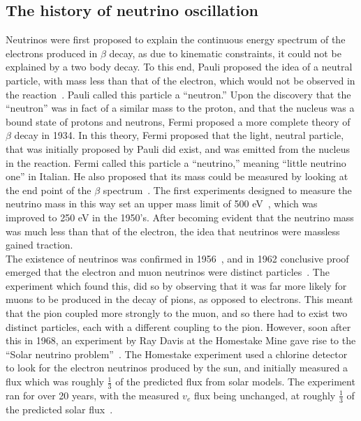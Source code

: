 \subsection{The history of neutrino oscillation} \label{Neut_Hist}
Neutrinos were first proposed to explain the continuous energy spectrum of the electrons produced in $\beta$ decay, as due to kinematic constraints, it could not be explained by a two body decay. To this end, Pauli proposed the idea of a neutral particle, with mass less than that of the electron, which would not be observed in the reaction~\citep{Pauli}. Pauli called this particle a ``neutron.'' Upon the discovery that the ``neutron'' was in fact of a similar mass to the proton, and that the nucleus was a bound state of protons and neutrons, Fermi proposed a more complete theory of $\beta$ decay in 1934. In this theory, Fermi proposed that the light, neutral particle, that was initially proposed by Pauli did exist, and was emitted from the nucleus in the reaction. Fermi called this particle a ``neutrino,'' meaning ``little neutrino one'' in Italian. He also proposed that its mass could be measured by looking at the end point of the $\beta$ spectrum~\citep{Fermi:1934hr}. The first experiments designed to measure the neutrino mass in this way set an upper mass limit of 500 eV~\citep{NeutMassLim1, NeutMassLim2}, which was improved to 250 eV in the 1950's\citep{NeutMassLim3}. After becoming evident that the neutrino mass was much less than that of the electron, the idea that neutrinos were massless gained traction. \\

The existence of neutrinos was confirmed in 1956~\citep{Cowan:1992xc}, and in 1962 conclusive proof emerged that the electron and muon neutrinos were distinct particles~\citep{PhysRevLett.9.36}. The experiment which found this, did so by observing that it was far more likely for muons to be produced in the decay of pions, as opposed to electrons. This meant that the pion coupled more strongly to the muon, and so there had to exist two distinct particles, each with a different coupling to the pion. However, soon after this in 1968, an experiment by Ray Davis at the Homestake Mine gave rise to the ``Solar neutrino problem''~\citep{RayDavis1968}. The Homestake experiment used a chlorine detector to look for the electron neutrinos produced by the sun, and initially measured a flux which was roughly $\frac{1}{3}$ of the predicted flux from solar models. The experiment ran for over 20 years, with the measured $v_{e}$ flux being unchanged, at roughly $\frac{1}{3}$ of the predicted solar flux~\citep{RayDavis1988}. \\

